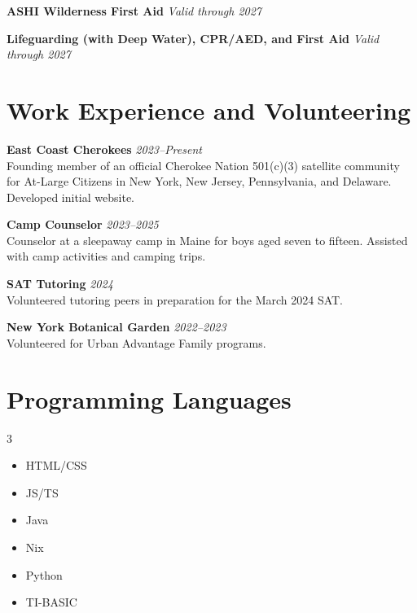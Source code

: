 \documentclass[11pt]{article}
\begin{document}
\textbf{ASHI Wilderness First Aid} \hfill \textit{Valid through 2027}

\vspace{1.5ex}

\textbf{Lifeguarding (with Deep Water), CPR/AED, and First Aid} \hfill \textit{Valid through 2027}

\section*{Work Experience and Volunteering}

\textbf{East Coast Cherokees} \hfill \textit{2023--Present} \\
Founding member of an official Cherokee Nation 501(c)(3) satellite community for At-Large Citizens in New York, New Jersey, Pennsylvania, and Delaware. Developed initial website. 

\vspace{1.5ex}

\textbf{Camp Counselor} \hfill \textit{2023--2025} \\
Counselor at a sleepaway camp in Maine for boys aged seven to fifteen. Assisted with camp activities and camping trips. 

\vspace{1.5ex}

\textbf{SAT Tutoring} \hfill \textit{2024} \\
Volunteered tutoring peers in preparation for the March 2024 SAT.

\vspace{1.5ex}

\textbf{New York Botanical Garden} \hfill \textit{2022--2023} \\
Volunteered for Urban Advantage Family programs.

\section*{Programming Languages}
\setlength{\multicolsep}{0.5ex}
\begin{multicols}{3}
\begin{itemize}[leftmargin=*, nosep]
  \item HTML/CSS
  \item JS/TS
  \item Java
  \item Nix
  \item Python
  \item TI-BASIC
\end{itemize}
\end{multicols}
\end{document}
